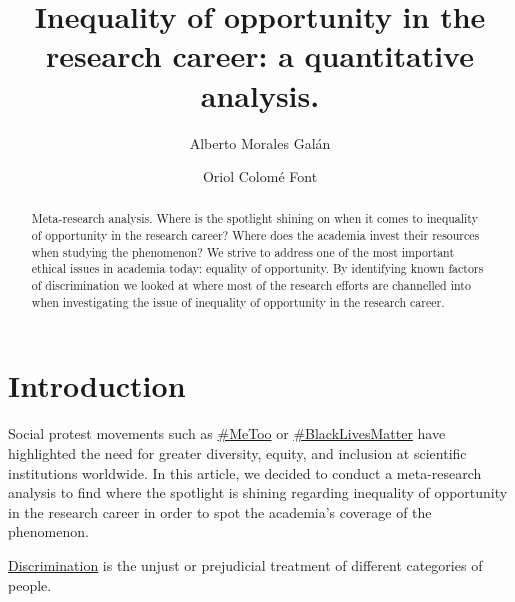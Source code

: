 \documentclass[runningheads]{llncs}
\begin{document}
\title{Inequality of opportunity in the research career: a quantitative analysis.}
\author{Alberto Morales Galán
\and
Oriol Colomé Font}
\maketitle              %
\begin{abstract}
Meta-research analysis. Where is the spotlight shining on when it comes to inequality of opportunity in the research career? Where does the academia invest their resources when studying the phenomenon? 
We strive to address one of the most important ethical issues in academia today: equality of opportunity. By identifying known factors of discrimination we looked at where most of the research efforts are channelled into when investigating the issue of inequality of opportunity in the research career.

\end{abstract}
\section{Introduction}
Social protest movements such as \href{https://hipatiapress.com/hpjournals/index.php/hse/article/view/10545/3659}{\#MeToo} or \href{https://doi.org/10.1016/j.jnma.2021.12.009}{\#BlackLivesMatter} have highlighted the need for greater diversity, equity, and inclusion at scientific institutions worldwide. In this article, we decided to conduct a meta-research analysis to find where the spotlight is shining regarding inequality of opportunity in the research career in order to spot the academia's coverage of the phenomenon.

\begin{definition}
\href{https://languages.oup.com/}{Discrimination} is the unjust or prejudicial treatment of different categories of people.
\end{definition}
\end{document}
